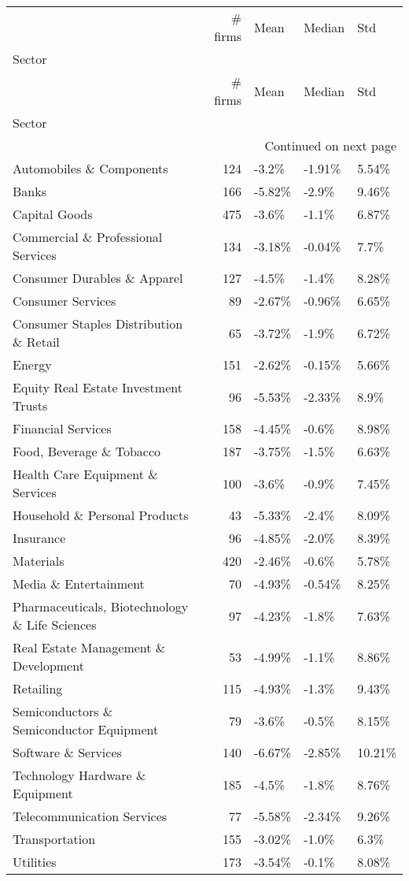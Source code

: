 \begin{longtable}{lrlll}
\toprule
 & \# firms & Mean & Median & Std \\
Sector &  &  &  &  \\
\midrule
\endfirsthead
\toprule
 & \# firms & Mean & Median & Std \\
Sector &  &  &  &  \\
\midrule
\endhead
\midrule
\multicolumn{5}{r}{Continued on next page} \\
\midrule
\endfoot
\bottomrule
\endlastfoot
Automobiles \& Components & 124 & -3.2\% & -1.91\% & 5.54\% \\
Banks & 166 & -5.82\% & -2.9\% & 9.46\% \\
Capital Goods & 475 & -3.6\% & -1.1\% & 6.87\% \\
Commercial \& Professional Services & 134 & -3.18\% & -0.04\% & 7.7\% \\
Consumer Durables \& Apparel & 127 & -4.5\% & -1.4\% & 8.28\% \\
Consumer Services & 89 & -2.67\% & -0.96\% & 6.65\% \\
Consumer Staples Distribution \& Retail & 65 & -3.72\% & -1.9\% & 6.72\% \\
Energy & 151 & -2.62\% & -0.15\% & 5.66\% \\
Equity Real Estate Investment Trusts & 96 & -5.53\% & -2.33\% & 8.9\% \\
Financial Services & 158 & -4.45\% & -0.6\% & 8.98\% \\
Food, Beverage \& Tobacco & 187 & -3.75\% & -1.5\% & 6.63\% \\
Health Care Equipment \& Services & 100 & -3.6\% & -0.9\% & 7.45\% \\
Household \& Personal Products & 43 & -5.33\% & -2.4\% & 8.09\% \\
Insurance & 96 & -4.85\% & -2.0\% & 8.39\% \\
Materials & 420 & -2.46\% & -0.6\% & 5.78\% \\
Media \& Entertainment & 70 & -4.93\% & -0.54\% & 8.25\% \\
Pharmaceuticals, Biotechnology \& Life Sciences & 97 & -4.23\% & -1.8\% & 7.63\% \\
Real Estate Management \& Development & 53 & -4.99\% & -1.1\% & 8.86\% \\
Retailing & 115 & -4.93\% & -1.3\% & 9.43\% \\
Semiconductors \& Semiconductor Equipment & 79 & -3.6\% & -0.5\% & 8.15\% \\
Software \& Services & 140 & -6.67\% & -2.85\% & 10.21\% \\
Technology Hardware \& Equipment & 185 & -4.5\% & -1.8\% & 8.76\% \\
Telecommunication Services & 77 & -5.58\% & -2.34\% & 9.26\% \\
Transportation & 155 & -3.02\% & -1.0\% & 6.3\% \\
Utilities & 173 & -3.54\% & -0.1\% & 8.08\% \\
\end{longtable}
